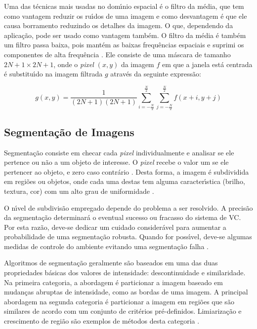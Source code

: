 Uma das t\'{e}cnicas mais usadas no dom\'{\i}nio espacial \'{e} o filtro da m\'{e}dia, que tem como vantagem reduzir os ru\'{\i}dos de uma imagem e como 
desvantagem \'{e} que ele causa borramento reduzindo os detalhes da imagem. O que, dependendo da aplica\c{c}\~{a}o, pode ser usado como 
vantagem tamb\'{e}m. O filtro da m\'{e}dia \'{e} tamb\'{e}m um filtro passa baixa, pois mant\'{e}m as baixas frequ\^{e}ncias espaciais e suprimi os 
componentes de alta frequ\^{e}ncia \cite{NIXON:2002}. Ele consiste de uma m\'{a}scara de tamanho $2N + 1 \times 2N + 1$, onde o 
\emph{pixel} $(x,y)$ da imagem $f$ em que a janela est\'{a} centrada \'{e} substitu\'{\i}do na imagem filtrada $g$ atrav\'{e}s da seguinte 
express\~{a}o:

\begin{equation}
\label{EQU:FILTMED}
g(x,y) = \frac{1}{(2N + 1)(2N + 1)}\sum\limits_{i=-\frac{N}{2}}^{\frac{N}{2}}\sum\limits_{j=-\frac{N}{2}}^{\frac{N}{2}} f(x + i, y 
+ j)
\end{equation}

\subsection{Segmenta\c{c}\~{a}o de Imagens}

Segmenta\c{c}\~{a}o consiste em checar cada \emph{pixel} individualmente e analisar se ele pertence ou n\~{a}o a um objeto de interesse. O 
\emph{pixel} recebe o valor um se ele pertencer ao objeto, e zero caso contr\'{a}rio \cite{JAHNE:2005}. Desta forma, a imagem \'{e} 
subdividida em regi\~{o}es ou objetos, onde cada uma destas tem alguma caracter\'{\i}stica (brilho, textura, cor) com um alto grau de 
uniformidade \cite{DAVIES:2004}.

O n\'{\i}vel de subdivis\~{a}o empregado depende do problema a ser resolvido. A precis\~{a}o da segmenta\c{c}\~{a}o determinar\'{a} o eventual sucesso ou 
fracasso do sistema de \ac{VC}. Por esta raz\~{a}o, deve-se dedicar um cuidado consider\'{a}vel para aumentar a probabilidade de uma 
segmenta\c{c}\~{a}o robusta. Quando for poss\'{\i}vel, deve-se algumas medidas de controle do ambiente evitando uma segmenta\c{c}\~{a}o falha 
\cite{GONZALEZ:2007}.

Algoritmos de segmenta\c{c}\~{a}o geralmente s\~{a}o baseados em uma das duas propriedades b\'{a}sicas dos valores de intensidade: descontinuidade 
e similaridade. Na primeira categoria, a abordagem \'{e} particionar a imagem baseado em mudan\c{c}as abruptas de intensidade, como as 
bordas de uma imagem. A principal abordagem na segunda categoria \'{e} particionar a imagem em regi\~{o}es que s\~{a}o similares de acordo com 
um conjunto de crit\'{e}rios pr\'{e}-definidos. Limiariza\c{c}\~{a}o e crescimento de regi\~{a}o s\~{a}o exemplos de m\'{e}todos desta categoria 
\cite{GONZALEZ:2007}.

